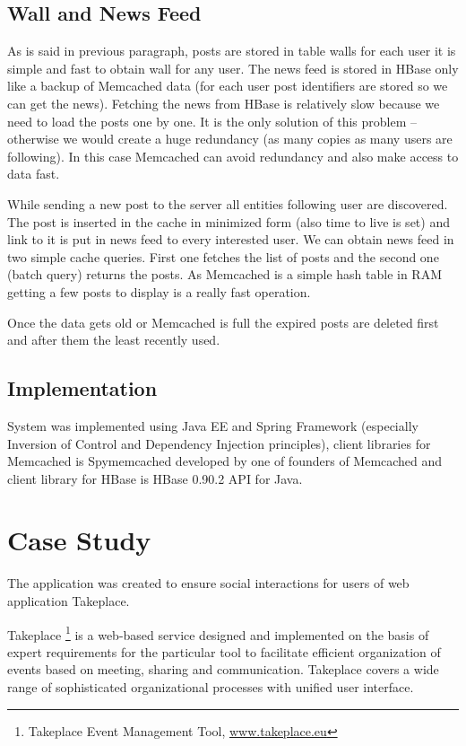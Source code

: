 \documentclass{llncs}
\begin{document}
\subsection{Wall and News Feed}
As is said in previous paragraph, posts are stored in table walls for each
user it is simple and fast to obtain wall for any user. The news feed is
stored in HBase only like a backup of Memcached data (for each user post
identifiers are stored so we can get the news).  Fetching the news from HBase
is relatively slow because we need to load the posts one by one.  It is the
only solution of this problem -- otherwise we would create a huge redundancy
(as many copies as many users are following). In this case Memcached can avoid
redundancy and also make access to data fast.

While sending a new post to the server all entities following user are
discovered. The post is inserted in the cache in minimized form (also time to
live is set) and link to it is put in news feed to every interested user. We
can obtain news feed in two simple cache queries. First one fetches the list
of posts and the second one (batch query) returns the posts. As Memcached is a
simple hash table in RAM getting a few posts to display is a really fast
operation.

Once the data gets old or Memcached is full the expired posts are deleted
first and after them the least recently used.

\subsection{Implementation}
System was implemented using Java EE and Spring Framework (especially
Inversion of Control and Dependency Injection principles), client libraries
for Memcached is Spymemcached developed by one of founders of Memcached and
client library for HBase is HBase 0.90.2 API for Java.

\section{Case Study}
The application was created to ensure social interactions for users of web
application Takeplace.

Takeplace \footnote{Takeplace Event Management Tool, \url{www.takeplace.eu}}
is a web-based service designed and implemented on the basis of expert
requirements for the particular tool to facilitate efficient organization of
events based on meeting, sharing and communication. Takeplace covers a wide
range of sophisticated organizational processes with unified user interface.
\end{document}
